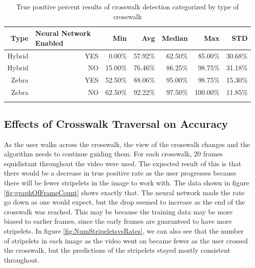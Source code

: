 \documentclass[12pt]{ucthesis}
\begin{document}
\clearpage

\begin{table}[t]
    \begin{longtable}{|r|r|r|r|r|r|r|}
    \hline
    Type  & \multicolumn{1}{l|}{Neural Network Enabled} & Min   & Avg   & Median & Max   & STD \bigstrut\\
    \hline
    Hybrid & YES   & 0.00\% & 57.92\% & 62.50\% & 85.00\% & 30.68\% \bigstrut\\
    \hline
    Hybrid & NO    & 15.00\% & 76.46\% & 86.25\% & 98.75\% & 31.18\% \bigstrut\\
    \hline
    Zebra & YES   & 52.50\% & 88.06\% & 95.00\% & 98.75\% & 15.30\% \bigstrut\\
    \hline
    Zebra & NO    & 62.50\% & 92.22\% & 97.50\% & 100.00\% & 11.85\% \bigstrut\\
    \hline


    \caption{True positive percent results of crosswalk detection categorized by type of crosswalk}
    \label{tab:typeOfCwalk} 
    \end{longtable}
\end{table}

\subsection{Effects of Crosswalk Traversal on Accuracy}

As the user walks across the crosswalk, the view of the crosswalk changes and the algorithm needs to continue guiding them. For each crosswalk, 20 frames equidistant throughout the video were used. The expected result of this is that there would be a decrease in true positive rate as the user progresses because there will be fewer stripelets in the image to work with. The data shown in figure \ref{fig:graphOfFrameCount} shows exactly that. The neural network made the rate go down as one would expect, but the drop seemed to increase as the end of the crosswalk was reached. This may be because the training data may be more biased to earlier frames, since the early frames are guaranteed to have more stripelets. In figure \ref{fig:NumStripeletsvsRates}, we can also see that the number of stripelets in each image as the video went on became fewer as the user crossed the crosswalk, but the predictions of the stripelets stayed mostly consistent throughout. 
\end{document}
